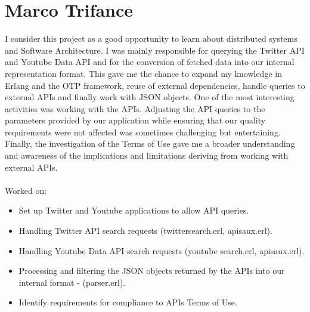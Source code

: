 \section{Marco Trifance}
I consider this project as a good opportunity to learn about distributed systems
and Software Architecture. I was mainly responsible for querying the Twitter API
and Youtube Data API and for the conversion of fetched data into our internal
representation format. This gave me the chance to expand my knowledge in Erlang
and the OTP framework, reuse of external dependencies, handle queries to
external APIs and finally work with JSON objects. One of the most interesting
activities was working with the APIs. Adjusting the API queries to the
parameters provided by our application while ensuring that our quality
requirements were not affected was sometimes challenging but entertaining.
Finally, the investigation of the Terms of Use gave me a broader understanding
and awareness of the implications and limitations deriving from working with
external APIs. \\ \\
Worked on:
\begin{itemize}
  \item Set up Twitter and Youtube applications to allow API queries.
  \item Handling Twitter API search requests (twitter\textunderscore search.erl,
        apis\textunderscore aux.erl).
  \item Handling Youtube Data API search requests (youtube\textunderscore
        search.erl, apis\textunderscore aux.erl).
  \item Processing and filtering the JSON objects returned by the APIs into our
        internal format - (parser.erl).
  \item Identify requirements for compliance to APIs Terms of Use.
\end{itemize}
\newpage


